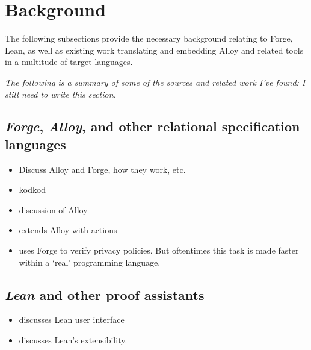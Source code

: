 \section{Background}

The following subsections provide the necessary background relating to Forge, Lean, as well as existing work translating and embedding Alloy and related tools in a multitude of target languages. 

\emph{\color{OliveGreen} The following is a summary of some of the sources and related work I've found: I still need to write this section.}

\subsection{\emph{Forge}, \emph{Alloy}, and other relational specification languages}\label{sec:bg-forge}
{\color{OliveGreen}
\begin{itemize}
    \item Discuss Alloy and Forge, how they work, etc. 
    \item \cite{torlak2007kodkod} kodkod
    \item \cite{torlak2013applications} discussion of Alloy
    \item \cite{frias2005dynalloy} extends Alloy with actions
    \item \cite{srajesh-honorsthesis,lzhu-honorsthesis} uses Forge to verify privacy policies. But oftentimes this task is made faster within a `real' programming language. 
\end{itemize}}

\subsection{\emph{Lean} and other proof assistants}\label{sec:bg-lean}
{\color{OliveGreen}
\begin{itemize}
    \item \cite{nawrocki2023extensible} discusses Lean user interface
    \item \cite{moura2021lean} discusses Lean's extensibility. 
\end{itemize}}

